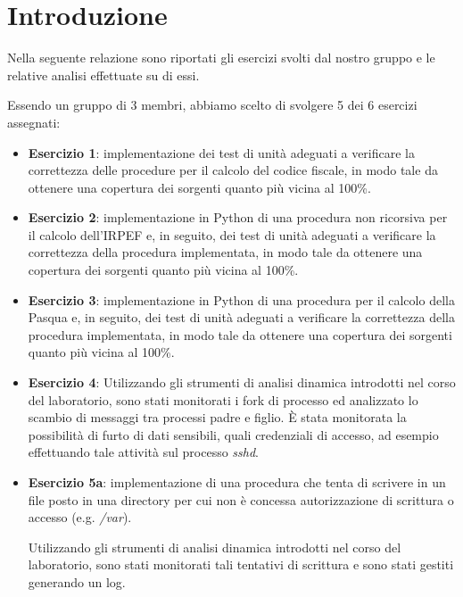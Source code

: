 \documentclass[a4paper, 12pt]{article}
\begin{document}
	\begin{frontespizio}
		\Preambolo{\usepackage{datetime}}
		\Scuola{}
	\end{frontespizio}
	\tableofcontents
	\newpage
	
	
	\section*{Introduzione}
	Nella seguente relazione sono riportati gli esercizi svolti dal nostro gruppo e le relative analisi effettuate su di essi.
	
	Essendo un gruppo di 3 membri, abbiamo scelto di svolgere 5 dei 6 esercizi assegnati:
	\begin{itemize}
		\item \textbf{Esercizio 1}: implementazione dei test di unità adeguati a verificare la correttezza delle procedure per il calcolo del codice fiscale, in modo tale da ottenere una copertura dei sorgenti quanto più vicina al 100\%.
		
		\item \textbf{Esercizio 2}: implementazione in Python di una procedura non ricorsiva per il calcolo dell’IRPEF e, in seguito, dei test di unità adeguati a verificare la correttezza della procedura implementata, in modo tale da ottenere una copertura dei sorgenti quanto più vicina al
		100\%.
		
		\item \textbf{Esercizio 3}: implementazione in Python di una procedura per il calcolo della Pasqua e, in seguito, dei test di unità adeguati a verificare la correttezza della procedura
		implementata, in modo tale da ottenere una copertura dei sorgenti quanto più vicina al
		100\%.
		
		\item \textbf{Esercizio 4}: Utilizzando gli strumenti di analisi dinamica introdotti nel corso del laboratorio, sono stati monitorati i fork di processo ed analizzato lo scambio di messaggi tra
		processi padre e figlio. \MakeUppercase{è} stata monitorata la possibilità di furto di dati sensibili, quali credenziali di accesso, ad esempio effettuando tale attività sul processo \textit{sshd}.
		
		\item \textbf{Esercizio 5a}: implementazione di una procedura che tenta di scrivere in un file posto in una directory per cui non è concessa autorizzazione di scrittura o accesso (e.g. \textit{/var}).
		
		\noindent
		Utilizzando gli strumenti di analisi dinamica introdotti nel corso del laboratorio, sono stati monitorati tali tentativi di scrittura e sono stati gestiti generando un log.
		
	\end{itemize}
	
\end{document}

